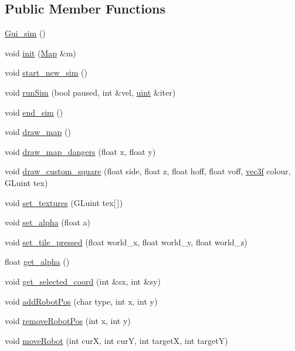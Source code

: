 \subsection*{Public Member Functions}
\begin{DoxyCompactItemize}
\item 
\hyperlink{class_gui__sim_add3078535e1413f60aecc41bfc6c0074}{Gui\-\_\-sim} ()
\item 
void \hyperlink{class_gui__sim_a6ff2df84a5a1fe1daa252120c8ee4289}{init} (\hyperlink{class_map}{Map} \&m)
\item 
void \hyperlink{class_gui__sim_abb1df0449546eb8b1004a6160291ecad}{start\-\_\-new\-\_\-sim} ()
\item 
void \hyperlink{class_gui__sim_ae290c48db83ff530e74f79692a1cfc69}{run\-Sim} (bool paused, int \&vel, \hyperlink{_robot__management_8h_a4d3943ddea65db7163a58e6c7e8df95a}{uint} \&iter)
\item 
void \hyperlink{class_gui__sim_acf8e3da57fa2a597e6fed331ed7c0998}{end\-\_\-sim} ()
\item 
void \hyperlink{class_gui__sim_ac6cf2c2801ef0ed361d0c008af1af029}{draw\-\_\-map} ()
\item 
void \hyperlink{class_gui__sim_adb9a92ce767129d60069f78a5ca5aff9}{draw\-\_\-map\-\_\-dangers} (float x, float y)
\item 
void \hyperlink{class_gui__sim_a9577f2cf114ebc2575c155a83f26c826}{draw\-\_\-custom\-\_\-square} (float side, float z, float hoff, float voff, \hyperlink{_gui_8h_a199ee0f48afbd5920bf30972f7a381dc}{vec3f} colour, G\-Luint tex)
\item 
void \hyperlink{class_gui__sim_aa4d039fb6cf1bb7e6a0b42b85893836a}{set\-\_\-textures} (G\-Luint tex\mbox{[}$\,$\mbox{]})
\item 
void \hyperlink{class_gui__sim_a5e7ac19ede590bb2ac4cf2240899cdd2}{set\-\_\-alpha} (float a)
\item 
void \hyperlink{class_gui__sim_aea6641ee3522e87c4ec79467de025a0b}{set\-\_\-tile\-\_\-pressed} (float world\-\_\-x, float world\-\_\-y, float world\-\_\-z)
\item 
float \hyperlink{class_gui__sim_a3bdae000c4d601303964fb410bfbbe58}{get\-\_\-alpha} ()
\item 
void \hyperlink{class_gui__sim_a85c41961dfd75313224b4c406c308579}{get\-\_\-selected\-\_\-coord} (int \&sx, int \&sy)
\item 
void \hyperlink{class_gui__sim_ad4feb119972837ac03d9e1dbe573211e}{add\-Robot\-Pos} (char type, int x, int y)
\item 
void \hyperlink{class_gui__sim_a73467161ff658d0bd334c7245f55bebe}{remove\-Robot\-Pos} (int x, int y)
\item 
void \hyperlink{class_gui__sim_affe2de35c0ebf9b76f7c07ddd76df1c2}{move\-Robot} (int cur\-X, int cur\-Y, int target\-X, int target\-Y)
\end{DoxyCompactItemize}
